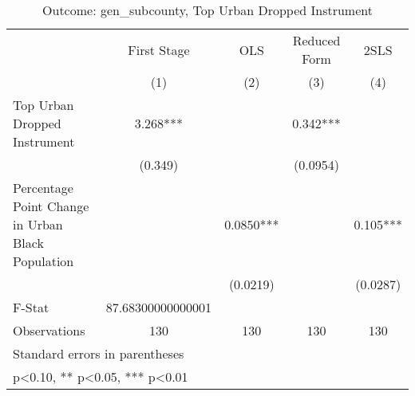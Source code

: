 \begin{table}[htbp]\centering
\def\sym#1{\ifmmode^{#1}\else\(^{#1}\)\fi}
\caption{Outcome: gen\_subcounty, Top Urban Dropped Instrument}
\begin{tabular}{l*{4}{c}}
\toprule
                    & First Stage   &         OLS   &Reduced Form   &        2SLS   \\
                    &\multicolumn{1}{c}{(1)}   &\multicolumn{1}{c}{(2)}   &\multicolumn{1}{c}{(3)}   &\multicolumn{1}{c}{(4)}   \\
\midrule
Top Urban Dropped Instrument&       3.268***&               &       0.342***&               \\
                    &     (0.349)   &               &    (0.0954)   &               \\
\addlinespace
Percentage Point Change in Urban Black Population&               &      0.0850***&               &       0.105***\\
                    &               &    (0.0219)   &               &    (0.0287)   \\
\midrule
F-Stat              &87.68300000000001   &               &               &               \\
Observations        &         130   &         130   &         130   &         130   \\
\bottomrule
\multicolumn{5}{l}{\footnotesize Standard errors in parentheses}\\
\multicolumn{5}{l}{\footnotesize * p<0.10, ** p<0.05, *** p<0.01}\\
\end{tabular}
\end{table}
